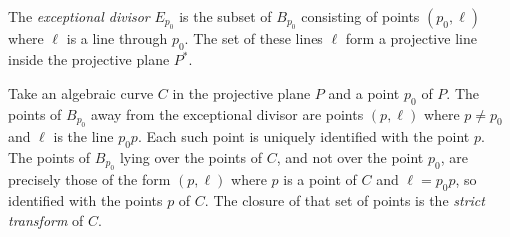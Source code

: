 The \emph{exceptional divisor} \(E_{p_0}\) is the subset of \(B_{p_0}\) consisting of points \((p_0,\ell)\) where \(\ell\) is a line through \(p_0\).
The set of these lines \(\ell\) form a projective line inside the projective plane \(P^*\).

Take an algebraic curve \(C\) in the projective plane \(P\) and a point \(p_0\) of \(P\).
The points of \(B_{p_0}\) away from the exceptional divisor are points \((p,\ell)\) where \(p\ne p_0\) and \(\ell\) is the line \(p_0 p\).
Each such point is uniquely identified with the point \(p\).
The points of \(B_{p_0}\) lying over the points of \(C\), and not over the point \(p_0\), are precisely those of the form \((p,\ell)\) where \(p\) is a point of \(C\) and \(\ell=p_0 p\), so identified with the points \(p\) of \(C\). 
The closure of that set of points is the \emph{strict transform} of \(C\).
